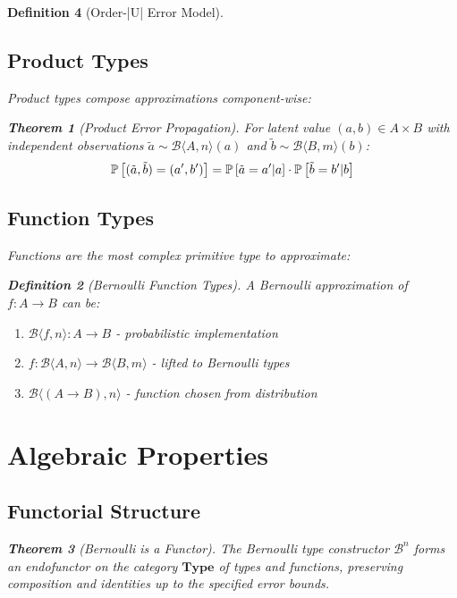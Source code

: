 \documentclass[11pt,final,hidelinks]{article}
\newtheorem{theorem}{Theorem}[section]
\newtheorem{definition}[theorem]{Definition}
\newcommand{\bernoulli}[2]{\mathcal{B}\langle #1, #2 \rangle}
\begin{document}
\begin{definition}[Order-|U| Error Model]
\subsection{Product Types}

Product types compose approximations component-wise:

\begin{theorem}[Product Error Propagation]
For latent value $(a, b) \in A \times B$ with independent observations $\tilde{a} \sim \bernoulli{A}{n}(a)$ and $\tilde{b} \sim \bernoulli{B}{m}(b)$:
\begin{equation}
\mathbb{P}\left[(\tilde{a}, \tilde{b}) = (a', b')\right] = \mathbb{P}\left[\tilde{a} = a' | a\right] \cdot \mathbb{P}\left[\tilde{b} = b' | b\right]
\end{equation}
\end{theorem}

\subsection{Function Types}

Functions are the most complex primitive type to approximate:

\begin{definition}[Bernoulli Function Types]
A Bernoulli approximation of $f: A \to B$ can be:
\begin{enumerate}
    \item $\bernoulli{f}{n}: A \to B$ - probabilistic implementation
    \item $f: \bernoulli{A}{n} \to \bernoulli{B}{m}$ - lifted to Bernoulli types
    \item $\bernoulli{(A \to B)}{n}$ - function chosen from distribution
\end{enumerate}
\end{definition}

\section{Algebraic Properties}

\subsection{Functorial Structure}

\begin{theorem}[Bernoulli is a Functor]
The Bernoulli type constructor $\mathcal{B}^n$ forms an endofunctor on the category $\mathbf{Type}$ of types and functions, preserving composition and identities up to the specified error bounds.
\end{theorem}


\end{definition}
\end{document}
